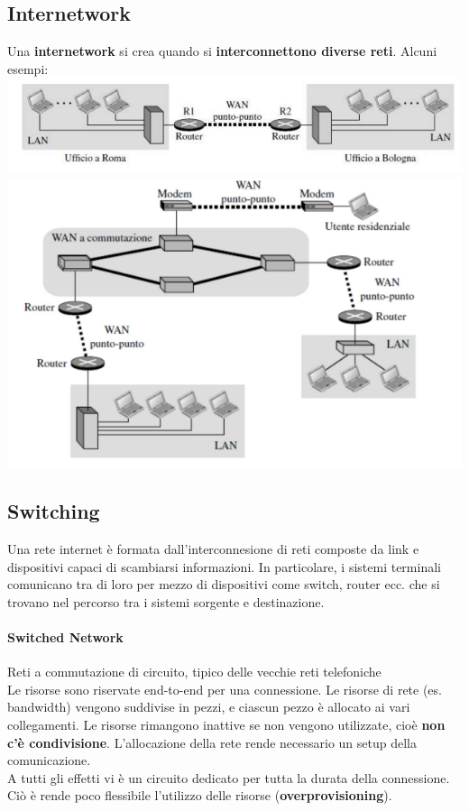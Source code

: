 \documentclass[10pt]{article}
\begin{document}
\subsection{Internetwork}
Una \textbf{internetwork} si crea quando si \textbf{interconnettono diverse reti}.
Alcuni esempi:\\
\includegraphics[scale=1]{internetwork1.png}\\
\includegraphics[scale=0.75]{internetwork2.png}\\

\subsection{Switching}
Una rete internet è formata dall'interconnesione di reti composte da link e dispositivi capaci di scambiarsi informazioni.
In particolare, i sistemi terminali comunicano tra di loro per mezzo di dispositivi come switch, router ecc. che si trovano nel percorso tra i sistemi sorgente e destinazione.
\paragraph{Switched Network} Reti a commutazione di circuito, tipico delle vecchie reti telefoniche\\
Le risorse sono riservate end-to-end per una connessione. Le risorse di rete (es. bandwidth) vengono suddivise in pezzi, e ciascun pezzo è allocato ai vari collegamenti. Le risorse rimangono inattive se non vengono utilizzate, cioè \textbf{non c'è condivisione}. L'allocazione della rete rende necessario un setup della comunicazione.\\A tutti gli effetti vi è un circuito dedicato per tutta la durata della connessione. Ciò è rende poco flessibile l'utilizzo delle risorse (\textbf{overprovisioning}).
\end{document}
